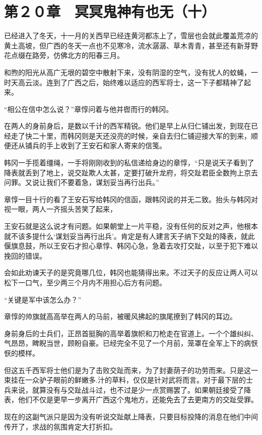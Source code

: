 \section{第２０章　冥冥鬼神有也无（十）}

已经进入了冬天，十一月的关西早已经连黄河都冻上了，雪层也会就此覆盖荒凉的黄土高坡，但广西的冬天一点也不见寒冷，流水潺潺、草木青青，甚至还有新芽野花点缀在路旁，仿佛北方的阳春三月。

和煦的阳光从高广无垠的碧空中散射下来，没有阴湿的空气，没有扰人的蚊蝇，一时天高云淡。连到了广西之后，始终难以适应的西军将士，这一下子都精神了起来。

“相公在信中怎么说？”章惇问着与他并辔而行的韩冈。

在两人的身前身后，是数以千计的西军精锐。他们是早上从归仁铺出发，到现在已经走了快二十里，而韩冈则是天还没亮的时候，亲自去归仁铺迎接大军的到来，顺便还从铺兵的手上收到了王安石和家人寄来的信笺。

韩冈一手揽着缰绳，一手将刚刚收到的私信递给身边的章惇，“只是说天子看到了降表就丢到了地上，说交趾欺人太甚，定要打破升龙府，将交趾君臣全数拘上京去问罪。又说让我们不要着急，谋划妥当再行出兵。”

章惇一目十行的看了王安石写给韩冈的信函，跟韩冈说的并无二致。抬头与韩冈对视一眼，两人一齐摇头苦笑了起来，

王安石就是这么说才有问题。如果朝堂上一片平稳，没有任何的反对之声，他根本就不该多提什么‘谋划妥当再行出兵’。肯定是有人建言天子纳下交趾的降表，就此偃旗息鼓，所以王安石才担心章惇、韩冈心急，急着去攻打交趾，以至于犯下难以挽回的错误。

会如此劝谏天子的是究竟哪几位，韩冈也能猜得出来。不过天子的反应让两人可以松下一口气，至少两三个月内不用担心后方有问题。

“关键是军中该怎么办？”

章惇的帅旗就高高举在两人的马前，被暖风拂起的旗尾撩到了韩冈的耳边。

身前身后的士兵们，正昂首挺胸的高举着旗帜和刀枪走在官道上。一个个雄纠纠、气昂昂，睥睨当世，顾盼自豪。已经完全不见了一个月前，笼罩在全军上下的病恹恹的模样。

但这五千西军将士他们是为了击败交趾而来，为了封妻荫子的功劳而来。只是这一束挂在一众驴子眼前的鲜嫩多.汁的草料，仅仅是针对武将而言。对于最下层的士兵来说，就算没有与交趾战斗过，也不过是少一点赏赐罢了。如果朝廷接受了降表，他们不仅是更早一步离开广西这个鬼地方，还能免去了去更南方的交趾受罪。

现在的这副气派只是因为没有听说交趾献上降表，只要目标投降的消息在他们中间传开了，求战的氛围肯定大打折扣。

